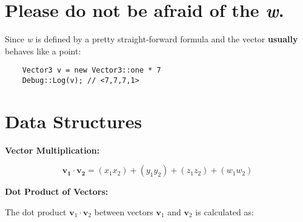 





\pagebreak

\section*{Please do not be afraid of the \emph{w}.}




Since \emph{w} is defined by a pretty straight-forward formula and the vector \textbf{usually} behaves like a point:


\begin{lstlisting}
    Vector3 v = new Vector3::one * 7
    Debug::Log(v); // <7,7,7,1>
\end{lstlisting}






\section*{Data Structures}
\textbf{Vector Multiplication:}

\begin{equation}
    \mathbf{v_1} \cdot \mathbf{v_2} = (x_1 x_2) + (y_1 y_2) + (z_1 z_2) + (w_1 w_2)
\end{equation}

\textbf{Dot Product of Vectors:}

The dot product \( \mathbf{v}_1 \cdot \mathbf{v}_2 \) between vectors \( \mathbf{v}_1 \) and \( \mathbf{v}_2 \) is calculated as:

